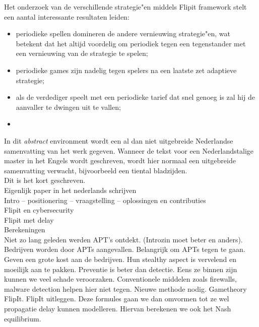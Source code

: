 \documentclass[master=cws, masteroption=vs]{kulemt}
\begin{document}
\begin{abstract*}
Het onderzoek van de verschillende strategie"en middels Flipit framework stelt een aantal interessante resultaten leiden:
\begin{itemize}
\item periodieke spellen domineren de andere vernieuwing strategie"en, wat betekent dat het altijd voordelig om periodiek tegen een tegenstander met een vernieuwing van de strategie te spelen;
\item periodieke games zijn nadelig tegen spelers na een laatste zet adaptieve strategie;
\item als de verdediger speelt met een periodieke tarief dat snel genoeg is zal hij de aanvaller te dwingen uit te vallen;
\item  
\end{itemize}

In dit \textit{abstract} environment wordt een al dan niet uitgebreide
Nederlandse samenvatting van het werk gegeven.
Wanneer de tekst voor een Nederlandstalige master in het Engels wordt
geschreven, wordt hier normaal een uitgebreide samenvatting verwacht,
bijvoorbeeld een tiental bladzijden. \\
  
Dit is het kort geschreven.\\ Eigenlijk paper in het nederlands schrijven \\
Intro -- positionering -- vraagstelling -- oplossingen en contributies \\
Flipit en cybersecurity\\
Flipit met delay \\
Berekeningen \\
Niet zo lang geleden werden APT's ontdekt. (Introzin moet beter en anders). Bedrijven worden door APTs aangevallen. Belangrijk om APTs tegen te gaan. Geven een grote kost aan de bedrijven. Hun stealthy aspect is vervelend en moeilijk aan te pakken. Preventie is beter dan detectie. Eens ze binnen zijn kunnen we veel schade veroorzaken. Conventionele middelen zoals firewalls, malware detection helpen hier niet tegen. Nieuwe methode nodig. Gametheory FlipIt. FlipIt uitleggen. Deze formules gaan we dan omvormen tot ze wel propagatie delay kunnen modelleren. Hiervan berekenen we ook het Nash equilibrium. 
\end{abstract*}
\end{document}
